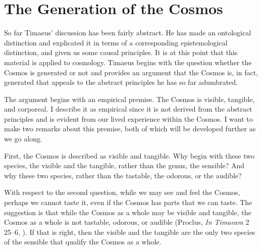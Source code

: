 
\section{The Generation of the Cosmos} %
\label{sec:the_generation_of_the_cosmos}

So far Timaeus' discussion has been fairly abstract. He has made an ontological distinction and explicated it in terms of a corresponding epistemological distinction, and given us some causal principles. It is at this point that this material is applied to cosmology. Timaeus begins with the question whether the Cosmos is generated or not and provides an argument that the Cosmos is, in fact, generated that appeals to the abstract principles he has so far adumbrated.

The argument begins with an empirical premise. The Cosmos is visible, tangible, and corporeal. I describe it as empirical since it is not derived from the abstract principles and is evident from our lived experience within the Cosmos. I want to make two remarks about this premise, both of which will be developed further as we go along.

First, the Cosmos is described as visible and tangible. Why begin with these two species, the visible and the tangible, rather than the genus, the sensible? And why these two species, rather than the tastable, the odorous, or the audible? 

With respect to the second question, while we may see and feel the Cosmos, perhaps we cannot taste it, even if the Cosmos has parts that we can taste. The suggestion is that while the Cosmos as a whole may be visible and tangible, the Cosmos as a whole is not tastable, odorous, or audible (Proclus, \emph{In Timaeam} 2 25--6, \citealt{Diehl:1903re}). If that is right, then the visible and the tangible are the only two species of the sensible that qualify the Cosmos as a whole.

